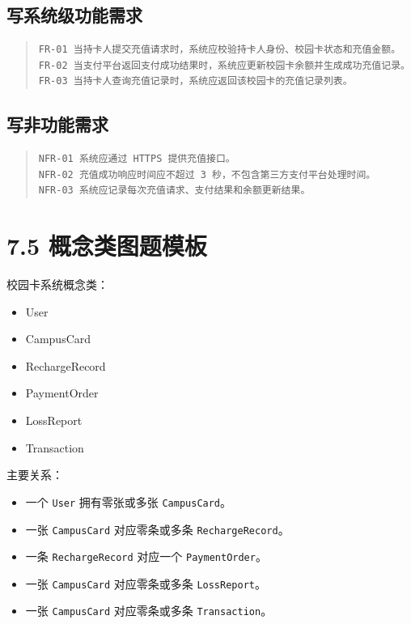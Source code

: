 \documentclass[UTF8,zihao=-4]{ctexart}
\begin{document}
\subsection{写系统级功能需求}

\begin{quote}
\footnotesize
\begin{verbatim}
FR-01 当持卡人提交充值请求时，系统应校验持卡人身份、校园卡状态和充值金额。
FR-02 当支付平台返回支付成功结果时，系统应更新校园卡余额并生成成功充值记录。
FR-03 当持卡人查询充值记录时，系统应返回该校园卡的充值记录列表。
\end{verbatim}
\end{quote}

\subsection{写非功能需求}

\begin{quote}
\footnotesize
\begin{verbatim}
NFR-01 系统应通过 HTTPS 提供充值接口。
NFR-02 充值成功响应时间应不超过 3 秒，不包含第三方支付平台处理时间。
NFR-03 系统应记录每次充值请求、支付结果和余额更新结果。
\end{verbatim}
\end{quote}

\section{7.5 概念类图题模板}

校园卡系统概念类：

\begin{itemize}
\item User
\item CampusCard
\item RechargeRecord
\item PaymentOrder
\item LossReport
\item Transaction
\end{itemize}

主要关系：

\begin{itemize}
\item 一个 \texttt{User} 拥有零张或多张 \texttt{CampusCard}。
\item 一张 \texttt{CampusCard} 对应零条或多条 \texttt{RechargeRecord}。
\item 一条 \texttt{RechargeRecord} 对应一个 \texttt{PaymentOrder}。
\item 一张 \texttt{CampusCard} 对应零条或多条 \texttt{LossReport}。
\item 一张 \texttt{CampusCard} 对应零条或多条 \texttt{Transaction}。
\end{itemize}
\end{document}
